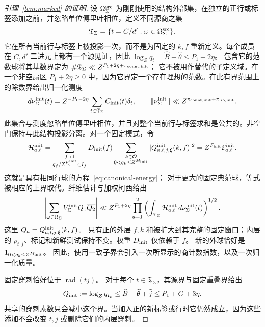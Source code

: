 \documentclass[11pt,a4paper]{article}
\numberwithin{equation}{section}
\numberwithin{figure}{section}
\theoremstyle{definition}
\theoremstyle{remark}
\begin{document}
\begin{proof}[引理~\ref{lem:marked} 的证明]
设 \(\Omega_\Sigma^{\rm src}\) 为刚刚使用的结构外部集，在独立的正行或标签添加之前，并忽略单位傅里叶相位，定义不同源商之集
\[
 \mathfrak T_\Sigma=\{t=C/d':\omega\in\Omega_\Sigma^{\rm src}\}.
\]
它在所有当前行与标签上被投影一次，而不是为固定的 \(k,f\) 重新定义。每个成员在 \(C,d'\) 二进元上都有一个源见证，因此
\(\log_Zq_t=\widehat B-\widehat\theta\le P_1+2\eta\)。
包含它的范数球将其基数界定为
\(\#\mathfrak T_\Sigma\ll Z^{P_1+2\eta+\pi_{{\rm count},{\rm init}}}\)；
它不被用作替代的子定义域。在一个非空扇区 \(P_1+2\eta\ge0\) 中，因为它界定一个存在理想的范数。在此有界范围上的除数界给出归一化测度
\begin{equation}\label{eq:initial-normalized-quotients}
 d\nu_\Sigma^{\rm init}(t)
 =Z^{-P_1-2\eta}\sum_{t\in\mathfrak T_\Sigma}C_{\rm init}(t)\delta_t,
 \qquad
 \|\nu_\Sigma^{\rm init}\|
 \ll Z^{\pi_{{\rm count},{\rm init}}+\pi_{{\rm fib},{\rm init}}}.
\end{equation}
此集合与测度忽略单位傅里叶相位，并且对整个当前行与标签求和是公共的。非空门保持与此结构投影分离。对一个固定模式，令
\begin{equation}\label{eq:initial-positive-child}
 \mathcal H_{a,t}^{\rm init}
 =\sum_{\substack{f\ {\rm sf}\\q_f/Z^{V_c^{\rm init}}\in I_f}}
 D_{\rm init}(f)\sum_{\substack{k\in\mathcal O\\0<q_k\le Z^{M_{\rm init}}}}
 |Q^{\rm init}_{a,t,j,\boldsymbol\xi}(k,f)|^2
 =Z^{F_{\rm init}}\mathcal E_{a,t}^{\rm init}.
\end{equation}
这就是具有相同行球的方程~\eqref{eq:canonical-energy}；
对于更大的固定典范球，等式被相应的上界取代。纤维估计与加权柯西给出
\begin{equation}\label{eq:initial-weighted-count}
 \left|\sum_{\omega\in\Omega_\Sigma}V_\Sigma^{\rm init}Q_1\overline{Q_2}\right|
 \ll Z^{P_1+2\eta}
 \prod_{a=1}^2
 \left(\int_{\mathfrak T_\Sigma}\mathcal H_{a,t}^{\rm init}
                         \,d\nu_\Sigma^{\rm init}(t)\right)^{1/2}.
\end{equation}
这里 \(Q_a=Q^{\rm init}_{a,t,j,\boldsymbol\xi}(k,f)\)。
只有正的外层 \(f,k\) 和被扩大到其完整的固定窗口；内层的 \(\rho_{t,j}\)、标记和新鲜测试保持不变。权重 \(D_{\rm init}\) 仅依赖于 \(f\)。
新的外球恰好是 \(1_{0<q_k\le Z^{M_{\rm init}}}\)。
因此，使用一致子界会引入一次所显示的商计数指数，以及一次归一化质量。

固定穿刺恰好位于 \(\operatorname{rad}(tj)\)。
对于每个 \(t\in\mathfrak T_\Sigma\)，其源界与固定重叠界给出
\begin{equation}\label{old-eq:4.13}
 Q_{\rm init}:=\log_Zq_{\mathfrak r_\rho}
 \le\widehat B-\widehat\theta+\widehat j\le P_1+G+3\eta.
\end{equation}
共享的穿刺素数只会减小这个界。当加入正的新标签或行时它仍然成立，因为这些添加不会改变 \(t,j\) 或删除它们的内层穿刺。


\end{proof}
\end{document}
